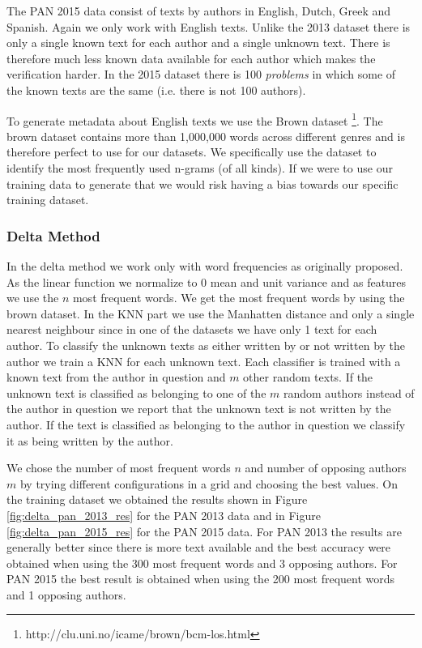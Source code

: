 The PAN 2015 data consist of texts by authors in English, Dutch, Greek and
Spanish. Again we only work with English texts. Unlike the 2013 dataset there is
only a single known text for each author and a single unknown text. There is
therefore much less known data available for each author which makes the
verification harder. In the 2015 dataset there is 100 \textit{problems} in which
some of the known texts are the same (i.e. there is not 100 authors).

To generate metadata about English texts we use the Brown dataset
\footnote{http://clu.uni.no/icame/brown/bcm-los.html}. The brown dataset
contains more than 1,000,000 words across different genres and is therefore
perfect to use for our datasets. We specifically use the dataset to identify
the most frequently used n-grams (of all kinds). If we were to use our training
data to generate that we would risk having a bias towards our specific training
dataset.

\subsubsection{Delta Method}
In the delta method we work only with word frequencies as originally proposed.
As the linear function we normalize to 0 mean and unit variance and as features
we use the $n$ most frequent words. We get the most frequent words by using the
brown dataset. In the \gls{KNN} part we use the Manhatten distance and only a
single nearest neighbour since in one of the datasets we have only 1 text for
each author. To classify the unknown texts as either written by or not written
by the author we train a \gls{KNN} for each unknown text. Each classifier is
trained with a known text from the author in question and $m$ other random
texts. If the unknown text is classified as belonging to one of the $m$ random
authors instead of the author in question we report that the unknown text is not
written by the author. If the text is classified as belonging to the author in
question we classify it as being written by the author.

We chose the number of most frequent words $n$ and number of opposing
authors $m$ by trying different configurations in a grid and choosing the
best values. On the training dataset we obtained the results shown in
Figure \ref{fig:delta_pan_2013_res} for the PAN 2013 data and in Figure
\ref{fig:delta_pan_2015_res} for the PAN 2015 data. For PAN 2013 the results are
generally better since there is more text available and the best accuracy were
obtained when using the 300 most frequent words and 3 opposing authors. For PAN
2015 the best result is obtained when using the 200 most frequent words and 1
opposing authors.

